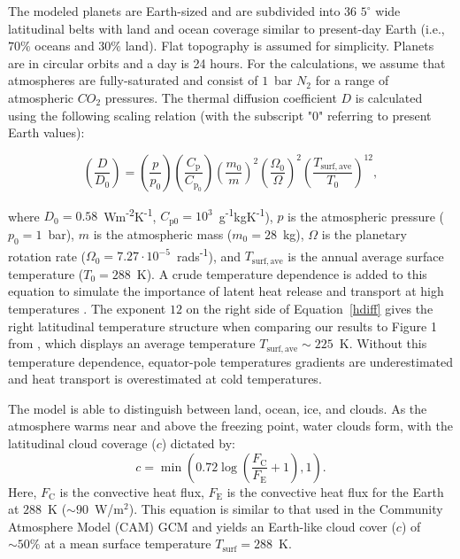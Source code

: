 \documentclass[fleqn,usenatbib]{mnras}
\begin{document}
The modeled planets are Earth-sized and are subdivided into 36 $5^{\circ}$ wide latitudinal belts with land and ocean coverage similar to present-day Earth (i.e., $70 \%$ oceans and $30 \%$ land). Flat topography is assumed for simplicity. Planets are in circular orbits and a day is 24 hours. For the calculations, we assume that atmospheres are fully-saturated and consist of $1$~bar $N_{\mathrm{2}}$ for a range of atmospheric $CO_{\mathrm{2}}$ pressures. The thermal diffusion coefficient $D$ is calculated using the following scaling relation (with the subscript "$0$" referring to present Earth values):

\begin{equation}
\label{hdiff}
    \left(\frac{D}{D_{\mathrm{0}}}\right)=\left(\frac{p}{p_{\mathrm{0}}}\right)\left(\frac{C_{\mathrm{p}}}{C_{\mathrm{p}_{0}}}\right)\left(\frac{m_{\mathrm{0}}}{m}\right)^{2}\left(\frac{\Omega_{0}}{\Omega}\right)^{2}\left(\frac{T_{\mathrm{surf,ave}}}{T_{\mathrm{0}}}\right)^{12},
\end{equation}

where $D_{\mathrm{0}}=0.58$~Wm\textsuperscript{-2}K\textsuperscript{-1}, $C_{\mathrm{p0}}=10^{3}$~g\textsuperscript{-1}kgK\textsuperscript{-1}), $p$ is the atmospheric pressure ($p_{\mathrm{0}}=1$~bar), $m$ is the atmospheric mass ($m_{\mathrm{0}}=28$~kg), $\Omega$ is the planetary rotation rate ($\Omega_{\mathrm{0}}=7.27 \cdot 10^{\mathrm{-5}}$~rads\textsuperscript{-1}), and $T_{\mathrm{surf,ave}}$ is the annual average surface temperature ($T_{\mathrm{0}}=288$~K). A crude temperature dependence is added to this equation to simulate the importance of latent heat release and transport at high temperatures \citep{Caballero2005a,Rose2017}. The exponent $12$ on the right side of Equation~\ref{hdiff} gives the right latitudinal temperature structure when comparing our results to Figure 1 from \citet{Turbet2017}, which displays an average temperature $T_{\mathrm{surf,ave}} \sim 225$~K. Without this temperature dependence, equator-pole temperatures gradients are underestimated and heat transport is overestimated at cold temperatures.

The model is able to distinguish between land, ocean, ice, and clouds. As the atmosphere warms near and above the freezing point, water clouds form, with the latitudinal cloud coverage ($c$) dictated by:
\begin{equation}
\label{cloud_coverage}
    c = \min \left ( 0.72 \log \left( \frac{F_{\mathrm{C}}}{F_{\mathrm{E}}} + 1 \right ),1 \right ).
\end{equation}
Here, $F_\mathrm{C}$ is the convective heat flux, $F_\mathrm{E}$ is the convective heat flux for the Earth at $288$~K ($\sim 90$~W/m$^2$). This equation is similar to that used in the Community Atmosphere Model (CAM) GCM \citep{xu1991, yang2014} and yields an Earth-like cloud cover ($c$) of $\sim 50 \%$ at a mean surface temperature $T_{\mathrm{surf}}=288$~K. 
\end{document}
